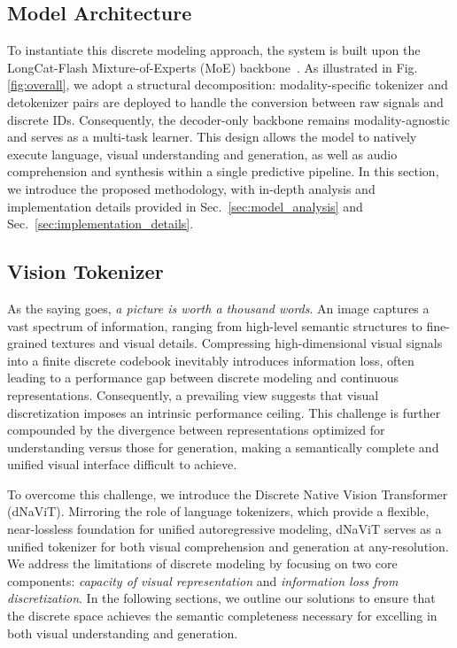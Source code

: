 \documentclass{article}
\begin{document}
\subsection{Model Architecture}


To instantiate this discrete modeling approach, the system is built upon the LongCat-Flash Mixture-of-Experts (MoE) backbone~\cite{meituanlongcatteam2025longcatflashtechnicalreport,longcat-flash-lite}. As illustrated in Fig. \ref{fig:overall}, we adopt a structural decomposition: modality-specific tokenizer and detokenizer pairs are deployed to handle the conversion between raw signals and discrete IDs. Consequently, the decoder-only backbone remains modality-agnostic and serves as a multi-task learner. This design allows the model to natively execute language, visual understanding and generation, as well as audio comprehension and synthesis within a single predictive pipeline. In this section, we introduce the proposed methodology, with in-depth analysis and implementation details provided in Sec.~\ref{sec:model_analysis} and Sec.~\ref{sec:implementation_details}.

\subsection{Vision Tokenizer}
\label{sec:visual_tokenizer}

As the saying goes, \textit{a picture is worth a thousand words}. An image captures a vast spectrum of information, ranging from high-level semantic structures to fine-grained textures and visual details. Compressing high-dimensional visual signals into a finite discrete codebook inevitably introduces information loss, often leading to a performance gap between discrete modeling and continuous representations. Consequently, a prevailing view suggests that visual discretization imposes an intrinsic performance ceiling. This challenge is further compounded by the divergence between representations optimized for understanding versus those for generation, making a semantically complete and unified visual interface difficult to achieve.
 

To overcome this challenge, we introduce the Discrete Native Vision Transformer (dNaViT). Mirroring the role of language tokenizers, which provide a flexible, near-lossless foundation for unified autoregressive modeling, dNaViT serves as a unified tokenizer for both visual comprehension and generation at any-resolution. We address the limitations of discrete modeling by focusing on two core components: \textit{capacity of visual representation} and \textit{information loss from discretization}. In the following sections, we outline our solutions to ensure that the discrete space achieves the semantic completeness necessary for excelling in both visual understanding and generation.
\end{document}
